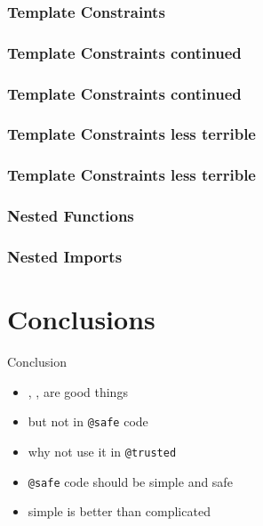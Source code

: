 \documentclass[aspectratio=169,notes]{beamer}
\begin{document}
	\begin{frame}[t]
		\frametitle{Template Constraints}
		
	\end{frame}

	\begin{frame}[t]
		\frametitle{Template Constraints continued}
		
	\end{frame}

	\begin{frame}[t]
		\frametitle{Template Constraints continued}
		
	\end{frame}

	\begin{frame}[t]
		\frametitle{Template Constraints less terrible}
		
	\end{frame}

	\begin{frame}[t]
		\frametitle{Template Constraints less terrible}
		
	\end{frame}

	\begin{frame}[t]
		\frametitle{Nested Functions}
		
			
	\end{frame}

	\begin{frame}[t]
		\frametitle{Nested Imports}
		
	\end{frame}

	\section{Conclusions}
	\begin{frame}[fragile]{Conclusion}
		\begin{itemize}
		\item \lstinline@scope@, \lstinline@ref@, \lstinline@return@ are good things
		\pause
		\item but not in \lstinline|@safe| code
		\pause
		\item why not use it in \lstinline|@trusted|
		\pause
		\item \lstinline|@safe| code should be simple and safe
		\pause
		\item simple is better than complicated
		\end{itemize}
	\end{frame}
\end{document}
